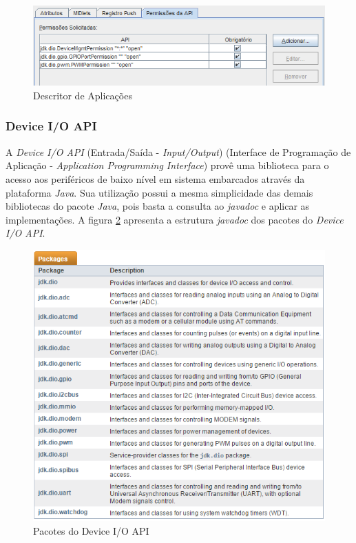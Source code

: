 \begin{figure}[H]
    \centering
    \includegraphics[width=0.7\linewidth]{figuras/java/java-me-application-descriptor.png}
    \caption{Descritor de Aplicações}
    \label{fig:java-me/application-descriptor}
\end{figure}

\subsubsection{Device I/O API}

A \textit{Device I/O API} (Entrada/Saída - \textit{Input/Output}) (Interface de Programação de Aplicação - \textit{Application Programming Interface}) provê uma biblioteca para o acesso aos periféricos de 
baixo nível em sistema embarcados através da plataforma \textit{Java}. Sua 
utilização possui a mesma simplicidade das demais bibliotecas do pacote 
\textit{Java}, pois basta a consulta ao \textit{javadoc} e aplicar as 
implementações. A figura \ref{fig:java-me/java-me-javadoc-deviceioapi} apresenta a estrutura \textit{javadoc} dos pacotes do \textit{Device I/O API}.

\begin{figure}[H]
	\centering
	\includegraphics[width=0.7\linewidth]{figuras/java/java-me-javadoc-deviceioapi.png}
	\caption{Pacotes do Device I/O API}
	\label{fig:java-me/java-me-javadoc-deviceioapi}
\end{figure}

